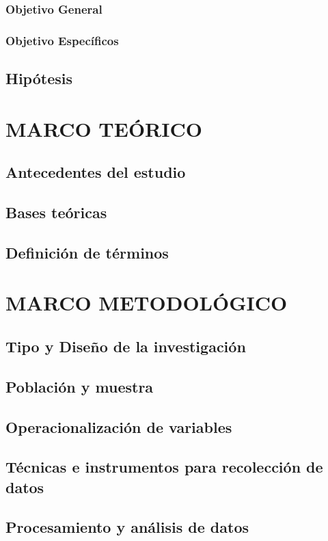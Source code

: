 \documentclass[12pt,a4paper,openany,oneside]{book}
\begin{document}
            \subsection{Objetivo General}
            \subsection{Objetivo Específicos}
        \section{Hipótesis}

    \chapter{MARCO TEÓRICO}
        \section{Antecedentes del estudio}
        \section{Bases teóricas}
        \section{Definición de términos}

    \chapter{MARCO METODOLÓGICO}
        \section{Tipo y Diseño de la investigación}
        \section{Población y muestra}
        \section{Operacionalización de variables}
        \section{Técnicas e instrumentos para recolección de datos}
        \section{Procesamiento y análisis de datos}
\end{document}
